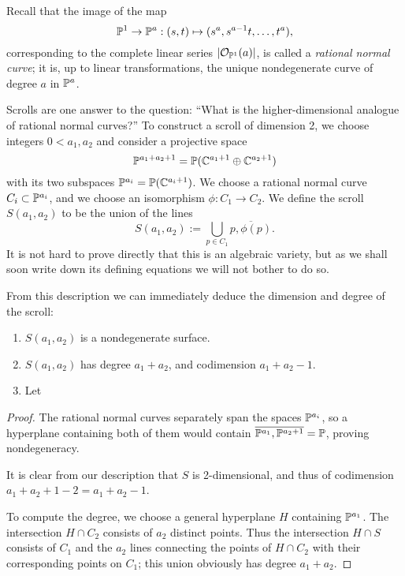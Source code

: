 Recall that the image of the map 
$$
\PP^1\to\PP^a: (s,t) \mapsto (s^a, s^{a-1}t, \dots, t^a),
$$
corresponding to the complete linear series
$|\cO_{\PP^1}(a)|$, is called a \emph{rational normal curve}; it is, up to linear transformations, the unique nondegenerate curve of degree $a$ in $\PP^a$.

Scrolls are one answer to the question: ``What is the higher-dimensional analogue of rational normal curves?'' To construct a scroll of dimension 2, we choose integers $0<a_1, a_2$ and consider  a projective space 
$$
\PP^{a_1+a_2+1} = \PP(\CC^{a_1+1}\oplus \CC^{a_2+1})
$$
with its two subspaces $\PP^{a_i} = \PP(\CC^{a_i+1})$. We choose a rational normal curve $C_i\subset \PP^{a_i}$, and we choose an isomorphism $\phi: C_1\to C_2$. We define the scroll $S(a_1, a_2)$ to be the union of the lines
$$
S(a_1,a_2) := \bigcup_{p\in C_1} \overline{p, \phi(p)}.
$$
It is not hard to prove directly that this is an algebraic variety, but as we shall soon write down its defining equations we will not bother to do so. 

From this description we can immediately deduce the dimension and degree of the scroll:
\begin{proposition}
\begin{enumerate}
\item $S(a_1,a_2)$ is a nondegenerate surface.
 \item $S(a_1,a_2)$ has degree $a_1+a_2$, and codimension $a_1+a_2-1.$
 \item Let 
\end{enumerate}

\end{proposition}\label{deg and codim}
\begin{proof}
 The rational normal curves separately span the spaces $\PP^{a_i}$, so a hyperplane containing both of them would contain $\overline{\PP^{a_1}, \PP^{a_{2}+1}} = \PP$, proving nondegeneracy. 
 
 It is clear from our description that $S$ is 2-dimensional, and thus of
codimension $a_{1}+a_{2}+1 -2 = a_{1}+a_{2}-1$. 

To compute the degree, we choose a general hyperplane $H$ containing $\PP^{a_{1}}$. The intersection $H\cap C_{2}$ consists of $a_{2}$ distinct points. Thus the intersection $H\cap S$ consists of $C_{1}$ and the $a_{2}$ lines connecting 
the points of $H\cap C_{2}$ with their corresponding points on $C_{1}$; this union obviously has degree $a_{1}+a_{2}$.
\end{proof}

